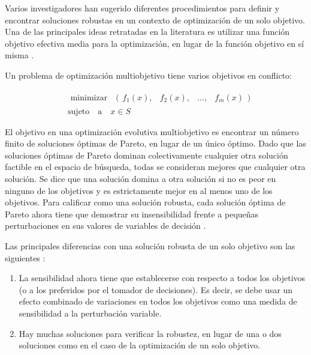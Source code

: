 Varios investigadores han sugerido diferentes procedimientos para definir y encontrar soluciones robustas en un contexto de optimización de un solo objetivo. Una de las principales ideas retratadas en la literatura es utilizar una función objetivo efectiva media para la optimización, en lugar de la función objetivo en sí misma \cite{Deb2006IntroducingRI}.

Un problema de optimización multiobjetivo tiene varios objetivos en conflicto:

\begin{equation} \label{ro_multi}
\begin{split}
& \textrm{ minimizar} \quad \bigl(\begin{smallmatrix}
 f_{1}(x), & f_{2}(x), & ..., & f_{m}(x)
\end{smallmatrix}\bigr) \\
& \textrm{sujeto} \quad \textrm{a} \quad  x \in S
\end{split}
\end{equation}

El objetivo en una optimización evolutiva multiobjetivo es encontrar un número finito de soluciones óptimas de Pareto, en lugar de un único óptimo. Dado que las soluciones óptimas de Pareto dominan colectivamente cualquier otra solución factible en el espacio de búsqueda, todas se consideran mejores que cualquier otra solución. Se dice que una solución domina a otra solución si no es peor en ninguno de los objetivos y es estrictamente mejor en al menos uno de los objetivos. Para calificar como una solución robusta, cada solución óptima de Pareto ahora tiene que demostrar su insensibilidad frente a pequeñas perturbaciones en sus valores de variables de decisión \cite{Deb2006IntroducingRI}.

Las principales diferencias con una solución robusta de un solo objetivo son las siguientes \cite{Deb2006IntroducingRI}:
\begin{enumerate}
     \item La sensibilidad ahora tiene que establecerse con respecto a todos los objetivos (o a los preferidos por el tomador de decisiones). Es decir, se debe usar un efecto combinado de variaciones en todos los objetivos como una medida de sensibilidad a la perturbación variable.
     \item Hay muchas soluciones para verificar la robustez, en lugar de una o dos soluciones como en el caso de la optimización de un solo objetivo.
\end{enumerate}

